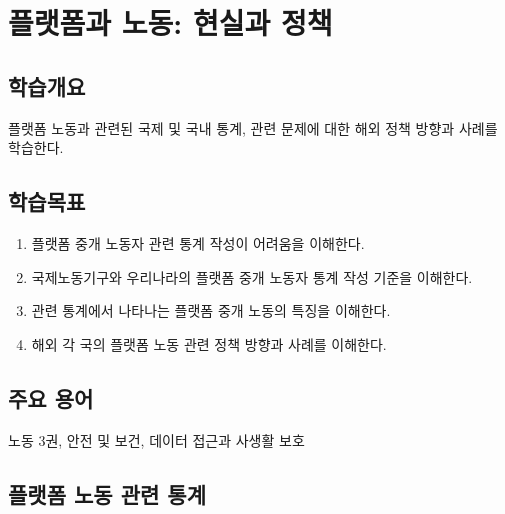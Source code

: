 \chapter{플랫폼과 노동: 현실과 정책}\label{cha:laborpolicy}

\section*{학습개요}
플랫폼 노동과 관련된 국제 및 국내 통계, 관련 문제에 대한 해외 정책 방향과 사례를 학습한다.

\section*{학습목표}
\begin{enumerate}
\item 플랫폼 중개 노동자 관련 통계 작성이 어려움을 이해한다.
\item 국제노동기구와 우리나라의 플랫폼 중개 노동자 통계 작성 기준을 이해한다.
\item 관련 통계에서 나타나는 플랫폼 중개 노동의 특징을 이해한다.
\item 해외 각 국의 플랫폼 노동 관련 정책 방향과 사례를 이해한다.
\end{enumerate}

\section*{주요 용어}
노동 3권, 안전 및 보건, 데이터 접근과 사생활 보호

\pagebreak

\section{플랫폼 노동 관련 통계}\label{sec:}
